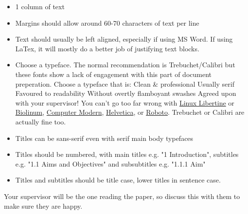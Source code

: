 \begin{itemize}
    \item 1 column of text
    \item Margins should allow around 60-70 characters of text per line
    \item Text should usually be left aligned, especially if using MS Word. If using LaTex, it will mostly do a better job of justifying text blocks.
    \item Choose a typeface. The normal recommendation is Trebuchet/Calibri but these fonts show a lack of engagement with this part of document preperation. Choose a typeface that is:
    \subitem Clean \& professional
    \subitem Usually serif
    \subitem Favoured to readability
    \subitem Without overtly flamboyant swashes
    \subitem Agreed upon with your supervisor!
    \subitem You can't go too far wrong with \hyperref[https://github.com/alerque/libertinus]{Linux Libertine} or \hyperref[https://tug.org/FontCatalogue/biolinum/]{Biolinum}, \hyperref[https://tug.org/FontCatalogue/computermodern/]{Computer Modern}, \hyperref[https://freefontsfamily.com/helvetica-font-family/]{Helvetica}, or \hyperref[https://fonts.google.com/specimen/Roboto]{Roboto}. Trebuchet or Calibri are actually fine too.
    \item Titles can be sans-serif even with serif main body typefaces
    \item Titles should be numbered, with main titles e.g. "1 Introduction", subtitles e.g. "1.1 Aims and Objectives" and subsubtitles e.g. "1.1.1 Aim"
    \item Titles and subtitles should be title case, lower titles in sentence case. 

\end{itemize}

Your supervisor will be the one reading the paper, so discuss this with them to make sure they are happy.

